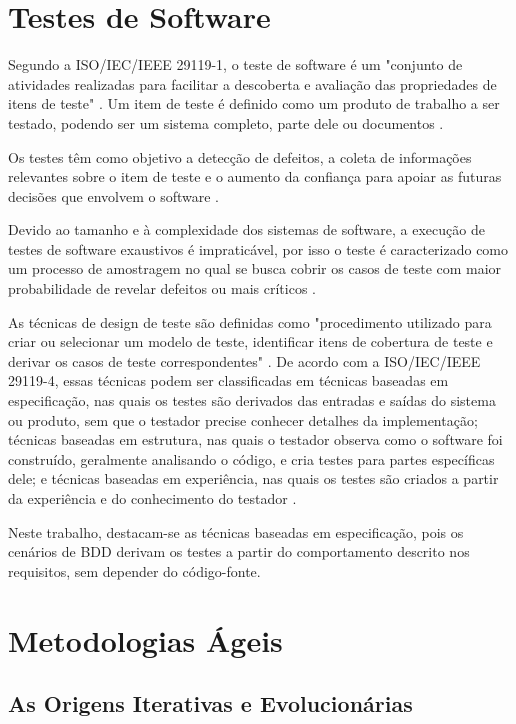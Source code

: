 \section{Testes de Software}

Segundo a ISO/IEC/IEEE 29119-1, o teste de software é um "conjunto de atividades realizadas para facilitar a descoberta e avaliação das propriedades de itens de teste" \cite[p.~15, tradução nossa]{iso29119_1_2022}. Um item de teste é definido como um produto de trabalho a ser testado, podendo ser um sistema completo, parte dele ou documentos \cite{iso29119_1_2022}.

Os testes têm como objetivo a detecção de defeitos, a coleta de informações relevantes sobre o item de teste e o aumento da confiança para apoiar as futuras decisões que envolvem o software \cite{iso29119_1_2022}.

Devido ao tamanho e à complexidade dos sistemas de software, a execução de testes de software exaustivos é impraticável, por isso o teste é caracterizado como um processo de amostragem no qual se busca cobrir os casos de teste com maior probabilidade de revelar defeitos ou mais críticos \cite{iso29119_1_2022}.

As técnicas de design de teste são definidas como "procedimento utilizado para criar ou selecionar um modelo de teste, identificar itens de cobertura de teste e derivar os casos de teste correspondentes" \cite[p.~11, tradução nossa]{iso29119_1_2022}. De acordo com a ISO/IEC/IEEE 29119-4, essas técnicas podem ser classificadas em técnicas baseadas em especificação, nas quais os testes são derivados das entradas e saídas do sistema ou produto, sem que o testador precise conhecer detalhes da implementação; técnicas baseadas em estrutura, nas quais o testador observa como o software foi construído, geralmente analisando o código, e cria testes para partes específicas dele; e técnicas baseadas em experiência, nas quais os testes são criados a partir da experiência e do conhecimento do testador \cite{iso29119_4_2021,iso29119_1_2022}.

Neste trabalho, destacam-se as técnicas baseadas em especificação, pois os cenários de BDD derivam os testes a partir do comportamento descrito nos requisitos, sem depender do código-fonte.

\section{Metodologias Ágeis}

\subsection{As Origens Iterativas e Evolucionárias}

